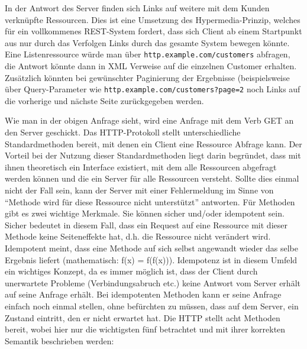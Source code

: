 In der Antwort des Server finden sich Links auf weitere mit dem Kunden verknüpfte Ressourcen. Dies ist eine Umsetzung des Hypermedia-Prinzip, welches für ein vollkommenes REST-System fordert\cite{tilkovrestchapter2}, dass sich Client ab einem Startpunkt aus nur durch das Verfolgen Links durch das gesamte System bewegen könnte. Eine Listenressource würde man über \texttt{http.example.com/customers} abfragen, die Antwort könnte dann in XML Verweise auf die einzelnen Customer erhalten. Zusätzlich könnten bei gewünschter Paginierung der Ergebnisse (beispielsweise über Query-Parameter wie \texttt{http.example.com/customers?page=2} noch Links auf die vorherige und nächste Seite zurückgegeben werden.

Wie man in der obigen Anfrage sieht, wird eine Anfrage mit dem Verb GET an den Server geschickt. Das HTTP-Protokoll stellt unterschiedliche Standardmethoden bereit, mit denen ein Client eine Ressource Abfrage kann. Der Vorteil bei der Nutzung dieser Standardmethoden liegt darin begründet, dass mit ihnen theoretisch ein Interface existiert, mit dem alle Ressourcen abgefragt werden können und die ein Server für alle Ressourcen versteht. Sollte dies einmal nicht der Fall sein, kann der Server mit einer Fehlermeldung im Sinne von "`Methode wird für diese Ressource nicht unterstützt"' antworten. Für Methoden gibt es zwei wichtige Merkmale. Sie können sicher und/oder idempotent sein\cite{tilkovrestchapter5}. Sicher bedeutet in diesem Fall, dass ein Request auf eine Ressource mit dieser Methode keine Seiteneffekte hat, d.h. die Ressource nicht verändert wird. Idempotent meint, dass eine Methode auf sich selbst angewandt wieder das selbe Ergebnis liefert (mathematisch: f(x) = f(f(x))). Idempotenz ist in diesem Umfeld ein wichtiges Konzept, da es immer möglich ist, dass der Client durch unerwartete Probleme (Verbindungsabruch etc.) keine Antwort vom Server erhält auf seine Anfrage erhält. Bei idempotenten Methoden kann er seine Anfrage einfach noch einmal stellen, ohne befürchten zu müssen, dass auf dem Server, ein Zustand eintritt, den er nicht erwartet hat. Die HTTP stellt acht Methoden bereit, wobei hier nur die wichtigsten fünf betrachtet und mit ihrer korrekten Semantik beschrieben werden\cite{tilkovrestchapter5}:
